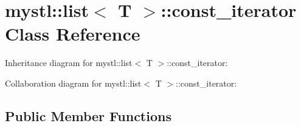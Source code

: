 \hypertarget{classmystl_1_1list_1_1const__iterator}{}\section{mystl\+:\+:list$<$ T $>$\+:\+:const\+\_\+iterator Class Reference}
\label{classmystl_1_1list_1_1const__iterator}


Inheritance diagram for mystl\+:\+:list$<$ T $>$\+:\+:const\+\_\+iterator\+:


Collaboration diagram for mystl\+:\+:list$<$ T $>$\+:\+:const\+\_\+iterator\+:
\subsection*{Public Member Functions}
